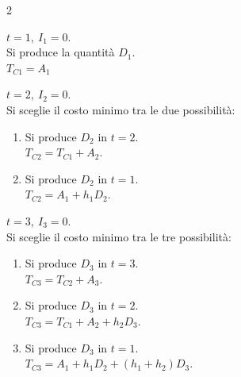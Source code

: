 \newpage
\begin{multicols}{2}

    \begin{stepbox}
        $t=1,~I_{1}=0 $. \\
        Si produce la quantità $ D_{1} $. \\
        $ T_{C1} = A_{1} $
    \end{stepbox}

    \begin{stepbox}
        $ t=2,~I_{2}=0 $. \\
        Si sceglie il costo minimo tra le due possibilità:
        \begin{enumerate}[label=\alph*)]
            \item Si produce $ D_{2} $ in $ t=2 $. \\ $ T_{C2} = T_{C1} + A_{2} $.
            \item Si produce $ D_{2} $ in $ t=1 $. \\ $ T_{C2} = A_{1} + h_{1}D_{2} $.
        \end{enumerate}
    \end{stepbox}

    \begin{stepbox}
        $ t=3,~I_{3}=0 $.\\
        Si sceglie il costo minimo tra le tre possibilità:
        \begin{enumerate}[label=\alph*)]
            \item Si produce $ D_{3} $ in $ t=3 $. \\ $ T_{C3} = T_{C2} + A_{3} $.
            \item Si produce $ D_{3} $ in $ t=2 $. \\ $ T_{C3} = T_{C1} + A_{2} + h_{2}D_{3} $.
            \item Si produce $ D_{3} $ in $ t=1 $. \\ $ T_{C3} = A_{1} + h_{1}D_{2} + (h_{1}+h_{2})D_{3} $.
        \end{enumerate}
    \end{stepbox}


\end{multicols}
